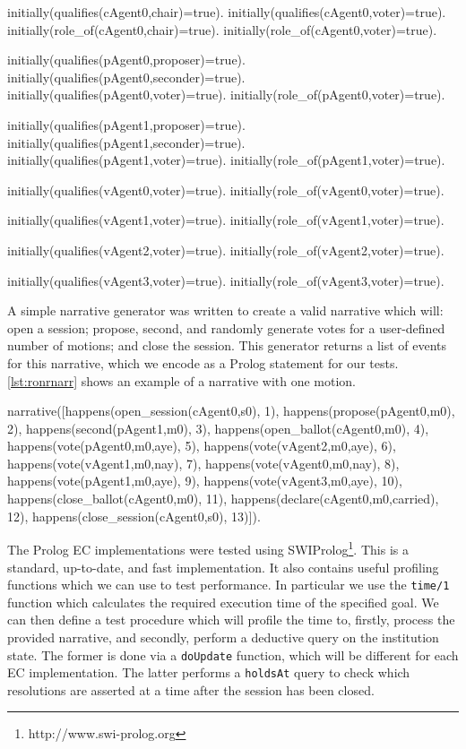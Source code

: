 \begin{prolog}[caption=Initial state of RONR in Prolog,label=lst:ronrinitially]
initially(qualifies(cAgent0,chair)=true).
initially(qualifies(cAgent0,voter)=true).
initially(role_of(cAgent0,chair)=true).
initially(role_of(cAgent0,voter)=true).

initially(qualifies(pAgent0,proposer)=true).
initially(qualifies(pAgent0,seconder)=true).
initially(qualifies(pAgent0,voter)=true).
initially(role_of(pAgent0,voter)=true).

initially(qualifies(pAgent1,proposer)=true).
initially(qualifies(pAgent1,seconder)=true).
initially(qualifies(pAgent1,voter)=true).
initially(role_of(pAgent1,voter)=true).

initially(qualifies(vAgent0,voter)=true).
initially(role_of(vAgent0,voter)=true).

initially(qualifies(vAgent1,voter)=true).
initially(role_of(vAgent1,voter)=true).

initially(qualifies(vAgent2,voter)=true).
initially(role_of(vAgent2,voter)=true).

initially(qualifies(vAgent3,voter)=true).
initially(role_of(vAgent3,voter)=true).
\end{prolog}

A simple narrative generator was written to create a valid narrative which
will: open a session; propose, second, and randomly generate
votes for a user-defined number of motions; and close the session. This
generator returns a list of events for this narrative, which we encode as a
Prolog statement for our tests. \autoref{lst:ronrnarr} shows an example of a
narrative with one motion.

\begin{prolog}[caption=RONR narrative with one motion passed,label=lst:ronrnarr]
narrative([happens(open_session(cAgent0,s0), 1),
	happens(propose(pAgent0,m0), 2),
	happens(second(pAgent1,m0), 3),
	happens(open_ballot(cAgent0,m0), 4),
	happens(vote(pAgent0,m0,aye), 5),
	happens(vote(vAgent2,m0,aye), 6),
	happens(vote(vAgent1,m0,nay), 7),
	happens(vote(vAgent0,m0,nay), 8),
	happens(vote(pAgent1,m0,aye), 9),
	happens(vote(vAgent3,m0,aye), 10),
	happens(close_ballot(cAgent0,m0), 11),
	happens(declare(cAgent0,m0,carried), 12),
	happens(close_session(cAgent0,s0), 13)]).
\end{prolog}

The Prolog \ac{EC} implementations were tested using SWIProlog\footnote{http://www.swi-prolog.org}.
This is a standard, up-to-date, and fast implementation. It also contains useful
profiling functions which we can use to test performance. In particular we use
the \texttt{time/1} function which calculates the required execution time of the
specified goal. We can then define a test procedure which will profile
the time to, firstly, process the provided narrative, and secondly, perform a
deductive query on the institution state. The former is done via a \texttt{doUpdate}
function, which will be different for each \ac{EC} implementation. The latter
performs a \texttt{holdsAt} query to check which resolutions are asserted at a
time after the session has been closed.

